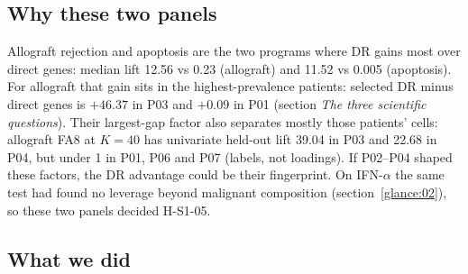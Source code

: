 \subsection*{Why these two panels}

Allograft rejection and apoptosis are the two programs where DR gains most over direct genes: median lift 12.56 vs 0.23\pp{} (allograft) and 11.52 vs 0.005\pp{} (apoptosis). For allograft that gain sits in the highest-prevalence patients: selected DR minus direct genes is $+46.37$\pp{} in P03 and $+0.09$\pp{} in P01 (section \emph{The three scientific questions}). Their largest-gap factor also separates mostly those patients' cells: allograft FA8 at $K = 40$ has univariate held-out lift 39.04\pp{} in P03 and 22.68\pp{} in P04, but under 1\pp{} in P01, P06 and P07 (labels, not loadings). If P02--P04 shaped these factors, the DR advantage could be their fingerprint. On IFN-$\alpha$ the same test had found no leverage beyond malignant composition (section~\ref{glance:02}), so these two panels decided H-S1-05. 

\subsection*{What we did}

